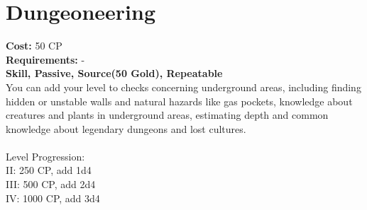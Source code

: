 \section{Dungeoneering}
\textbf{Cost:} 50 CP\\
\textbf{Requirements:} -\\
\textbf{Skill, Passive, Source(50 Gold), Repeatable}\\
You can add your level to checks concerning underground areas, including finding hidden or unstable walls and natural hazards like gas pockets, knowledge about creatures and plants in underground areas, estimating depth and common knowledge about legendary dungeons and lost cultures.\\
\\
Level Progression:\\
II: 250 CP, add 1d4\\
III: 500 CP, add 2d4\\
IV: 1000 CP, add 3d4\\